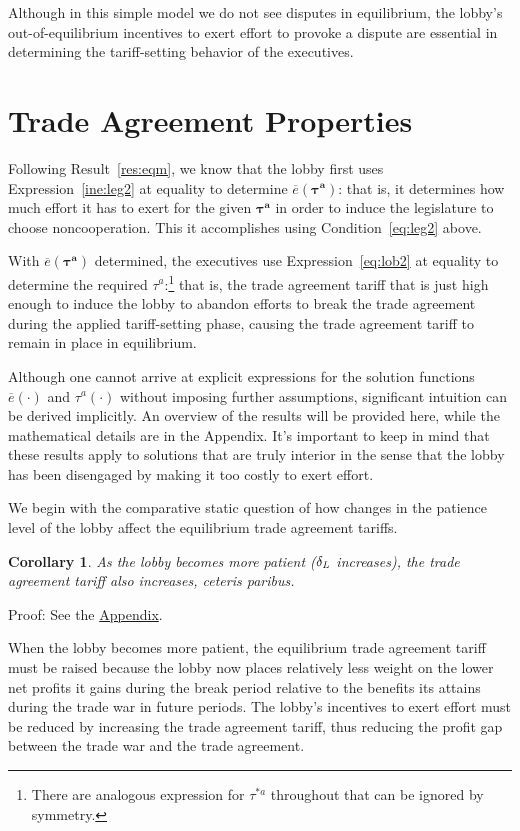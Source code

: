 \documentclass[authoryear, review]{elsarticle}
\newtheorem{corollary}{Corollary}
\newcommand{\ov}{\overline}
\newcommand{\bta}{\bm{\tau^a}}
\newcommand{\de}{\delta}
\begin{document}
Although in this simple model we do not see disputes in equilibrium, the lobby's out-of-equilibrium incentives to exert effort to provoke a dispute are essential in determining the tariff-setting behavior of the executives.

\section{Trade Agreement Properties}
\label{sec:prop}
Following Result~\ref{res:eqm}, we know that the lobby first uses Expression~\ref{ine:leg2} at equality to determine $\ov{e}(\bta)$: that is, it determines how much effort it has to exert for the given $\bta$ in order to induce the legislature to choose noncooperation. This it accomplishes using Condition~\ref{eq:leg2} above.

With $\ov{e}(\bta)$ determined, the executives use Expression~\ref{eq:lob2} at equality to determine the required $\tau^a$:\footnote{There are analogous expression for $\tau^{*a}$ throughout that can be ignored by symmetry.} that is, the trade agreement tariff that is just high enough to induce the lobby to abandon efforts to break the trade agreement during the applied tariff-setting phase, causing the trade agreement tariff to remain in place in equilibrium.

Although one cannot arrive at explicit expressions for the solution functions $\ov{e}(\cdot)$ and $\tau^a(\cdot)$ without imposing further assumptions, significant intuition can be derived implicitly. An overview of the results will be provided here, while the mathematical details are in the Appendix. It's important to keep in mind that these results apply to solutions that are truly interior in the sense that the lobby has been disengaged by making it too costly to exert effort.

We begin with the comparative static question of how changes in the patience level of the lobby affect the equilibrium trade agreement tariffs.

\begin{corollary}
  As the lobby becomes more patient ($\de_\emph{L}$ increases), the trade agreement tariff also increases, \emph{ceteris paribus}.
  \label{cor:tdl}
\end{corollary}

Proof: See the \hyperlink{Cor_tdl}{Appendix}.

\noindent When the lobby becomes more patient, the equilibrium trade agreement tariff must be raised because the lobby now places relatively less weight on the lower net profits it gains during the break period relative to the benefits its attains during the trade war in future periods. The lobby's incentives to exert effort must be reduced by increasing the trade agreement tariff, thus reducing the profit gap between the trade war and the trade agreement.
\end{document}

